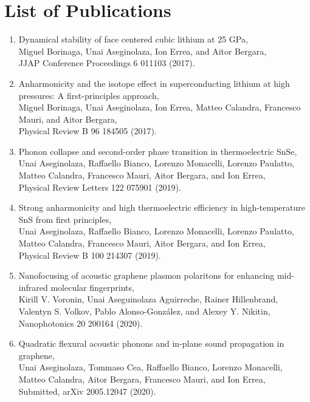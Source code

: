 
\chapter*{List of Publications} %

\begin{enumerate}
\item Dynamical stability of face centered cubic lithium at 25 GPa, \\
Miguel Borinaga, Unai Aseginolaza, Ion Errea, and Aitor Bergara, \\
JJAP Conference Proceedings 6 011103 (2017).
\item Anharmonicity and the isotope effect in superconducting lithium at high pressures: A first-principles 
approach, \\ Miguel Borinaga, Unai Aseginolaza, Ion Errea, Matteo Calandra, Francesco Mauri, and Aitor Bergara, \\
Physical Review B 96 184505 (2017).
\item Phonon collapse and second-order phase transition in thermoelectric SnSe, \\ Unai Aseginolaza, Raffaello 
Bianco, Lorenzo Monacelli, Lorenzo Paulatto, Matteo Calandra, Francesco Mauri, Aitor Bergara, and Ion Errea, \\
Physical Review Letters 122 075901 (2019).
\item Strong anharmonicity and high thermoelectric efficiency in high-temperature SnS from first principles, \\
Unai Aseginolaza, Raffaello Bianco, Lorenzo Monacelli, Lorenzo Paulatto, Matteo Calandra, Francesco Mauri, Aitor 
Bergara, and Ion Errea, \\ Physical Review B 100 214307 (2019).
\item Nanofocusing of acoustic graphene plasmon polaritons for enhancing mid-infrared molecular fingerprints, \\ 
Kirill V. Voronin, Unai Aseguinolaza Aguirreche, Rainer Hillenbrand, Valentyn S. Volkov, Pablo Alonso-González, and 
Alexey Y. Nikitin, \\ Nanophotonics 20 200164 (2020).
\item Quadratic flexural acoustic phonons and in-plane sound propagation in graphene, \\ Unai Aseginolaza, Tommaso 
Cea, Raffaello Bianco, Lorenzo Monacelli, Matteo Calandra, Aitor Bergara, Francesco Mauri, and Ion Errea, \\ 
Submitted, arXiv 2005.12047 (2020).
\end{enumerate}
